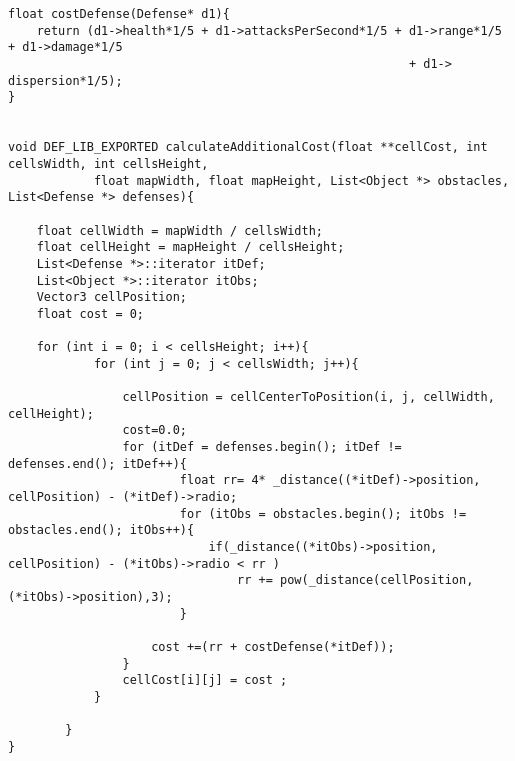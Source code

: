 \begin{lstlisting}
float costDefense(Defense* d1){
    return (d1->health*1/5 + d1->attacksPerSecond*1/5 + d1->range*1/5 + d1->damage*1/5
                                                        + d1-> dispersion*1/5);
}


void DEF_LIB_EXPORTED calculateAdditionalCost(float **cellCost, int cellsWidth, int cellsHeight, 
            float mapWidth, float mapHeight, List<Object *> obstacles, List<Defense *> defenses){

    float cellWidth = mapWidth / cellsWidth;
    float cellHeight = mapHeight / cellsHeight;
    List<Defense *>::iterator itDef;
    List<Object *>::iterator itObs;
    Vector3 cellPosition;
    float cost = 0;

    for (int i = 0; i < cellsHeight; i++){
            for (int j = 0; j < cellsWidth; j++){

                cellPosition = cellCenterToPosition(i, j, cellWidth, cellHeight);
                cost=0.0;
                for (itDef = defenses.begin(); itDef != defenses.end(); itDef++){
                        float rr= 4* _distance((*itDef)->position, cellPosition) - (*itDef)->radio;
                        for (itObs = obstacles.begin(); itObs != obstacles.end(); itObs++){
                            if(_distance((*itObs)->position, cellPosition) - (*itObs)->radio < rr )
                                rr += pow(_distance(cellPosition, (*itObs)->position),3);
                        }
                
                    cost +=(rr + costDefense(*itDef));
                }
                cellCost[i][j] = cost ;
            }

        }
}
\end{lstlisting}